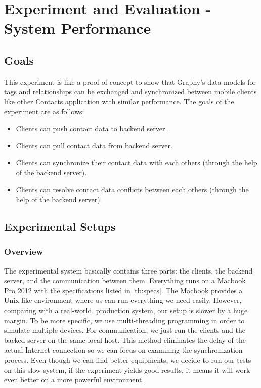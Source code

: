 \chapter{Experiment and Evaluation - System Performance}
\section{Goals}
This experiment is like a proof of concept to show that Graphy's data models for tags and relationships can be exchanged and synchronized between mobile clients like other Contacts application with similar performance. The goals of the experiment are as follows:

\begin{itemize}
    \item Clients can push contact data to backend server.
    \item Clients can pull contact data from backend server.
    \item Clients can synchronize their contact data with each others (through the help of the backend server).
    \item Clients can resolve contact data conflicts between each others (through the help of the backend server).
\end{itemize}

\section{Experimental Setups}
\subsection{Overview}
The experimental system basically contains three parts: the clients, the backend server, and the communication between them. Everything runs on a Macbook Pro 2012 with the specifications listed in \autoref{tb:specs}. The Macbook provides a Unix-like environment where us can run everything we need easily. However, comparing with a real-world, production system, our setup is slower by a huge margin. To be more specific, we use multi-threading programming in order to simulate multiple devices. For communication, we just run the clients and the backed server on the same local host. This method eliminates the delay of the actual Internet connection so we can focus on examining the synchronization process. Even though we can find better equipments, we decide to run our tests on this slow system, if the experiment yields good results, it means it will work even better on a more powerful environment.

